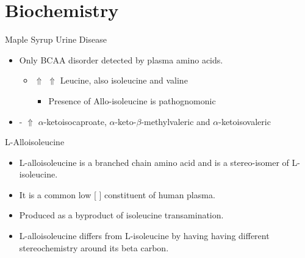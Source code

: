 \documentclass[presentation, smaller]{beamer}
\begin{document}
\section{Biochemistry}
\label{sec:orgheadline13}
\begin{frame}[label={sec:orgheadline4}]{Maple Syrup Urine Disease}
\begin{itemize}
\item Only BCAA disorder detected by plasma amino acids.
\begin{itemize}
\item \(\Uparrow\) \(\Uparrow\) Leucine, also isoleucine and valine
\begin{itemize}
\item Presence of Allo-isoleucine is pathognomonic
\end{itemize}
\end{itemize}
\item - \(\Uparrow\) \(\alpha\)-ketoisocaproate, \(\alpha\)-keto-\(\beta\)-methylvaleric and \(\alpha\)-ketoisovaleric
\end{itemize}
\end{frame}
\begin{frame}[label={sec:orgheadline5}]{L-Alloisoleucine}
\begin{itemize}
\item L-alloisoleucine is a branched chain amino acid and is a
stereo-isomer of L-isoleucine.
\item It is a common low [ ] constituent of human plasma.
\item Produced as a byproduct of isoleucine transamination.
\item L-alloisoleucine differs from L-isoleucine by having having
different stereochemistry around its beta carbon.
\end{itemize}

\centering
{}
\end{frame}
\end{document}
